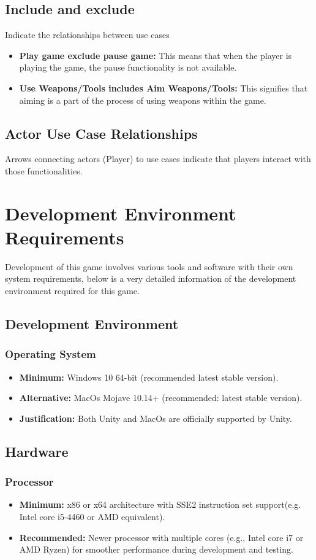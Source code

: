 \subsection{Include and exclude}Indicate the relationships between use cases
\begin{itemize}
	\item \textbf{Play game exclude pause game:} This means that when the player is playing the game, the pause functionality is not available.
	\item \textbf{Use Weapons/Tools includes Aim Weapons/Tools:} This signifies that aiming is a part of the process of using weapons within the game.
\end{itemize}
\subsection{Actor Use Case Relationships}
Arrows connecting actors (Player) to use cases indicate that players interact with those functionalities.
\section{Development Environment Requirements}
Development of this game involves various tools and software with their own system requirements, below is a very detailed information of the development environment required for this game.
\subsection{Development Environment}
\subsubsection{Operating System}
\begin{itemize}
	\item \textbf{Minimum:} Windows 10 64-bit (recommended latest stable version).
	\item \textbf{Alternative:} MacOs Mojave 10.14+ (recommended: latest stable version).
	\item \textbf{Justification:} Both Unity and MacOs are officially supported by Unity.
\end{itemize}
\subsection{Hardware}
\subsubsection{Processor}
\begin{itemize}
	\item \textbf{Minimum:} x86 or x64 architecture with SSE2 instruction set support(e.g. Intel core i5-4460 or AMD equivalent).
	\item \textbf{Recommended:} Newer processor with multiple cores (e.g., Intel core i7 or AMD Ryzen) for smoother performance during development and testing.
\end{itemize}
